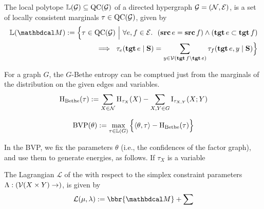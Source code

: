 \documentclass[dyna.tex]{subfiles}
\begin{document}
\begin{defn}
    The local polytope $\mathbb L(\mathcal G) \subseteq \operatorname{\mathrm{QC}}(\mathcal G)$ of a directed hypergraph $\mathcal G = (\mathcal N, \mathcal E)$, is a set of locally consistent marginals $\tau \in \operatorname{\mathrm{QC}}(\mathcal G)$, given by
    \begin{equation}
        \begin{split}
            \mathbb L(\dg M) := \Big\{ \tau \in \QC(\mathcal G)
                ~\Big|~ \forall e, f \in \Ed.~~(\src e = \src f)\land(\tgt e \subset \tgt f) \\ 
                    ~\implies~ \tau_e(\tgt e \mid \mat S) =  \sum_{y \in \V(\tgt f  \setminus \tgt e)} \tau_f(\tgt e, y \mid \mat S)  \Big\}                
        \end{split}
\end{equation}
    
\end{defn}

\begin{defn}
    For a graph $G$, the $G$-Bethe entropy can be comptued just from the marginals
    of the distribution on the given edges and variables.  
    \begin{equation}
        \operatorname{\mathrm{H}}_{\mathrm{Bethe}}(\tau) := \sum_{X \in \mathcal N} \operatorname{\mathrm{H}}_{\tau_X}(X) - \sum_{X,Y \in G} \operatorname{\mathrm{I}}_{\tau_{X,Y}}(X; Y) 
    \end{equation}
\end{defn}

\begin{defn}
    \begin{equation}
        \mathop{\mathrm{BVP}}(\theta) := \max_{\tau \in \mathbb L(G)} 
            \Big\{ \langle \theta, \tau\rangle - \operatorname{\mathrm{H}}_{\mathrm{Bethe}}(\tau)\Big\}
    \end{equation}
\end{defn}

In the BVP, we fix the parameters $\theta$ (i.e., the confidences of the factor graph),
and use them to generate energies, as follows. If $\tau_X$ is a variable 

\begin{defn}

    The Lagrangian $\mathcal L$ of the with respect to the simplex constraint parameters $\Lambda : (\mathcal V(X\times Y) \to )$, is given by
    \begin{equation}
        \mathcal L(\mu, \lambda) := \bbr{\dg M} + \sum
    \end{equation}
\end{defn}
\end{document}
